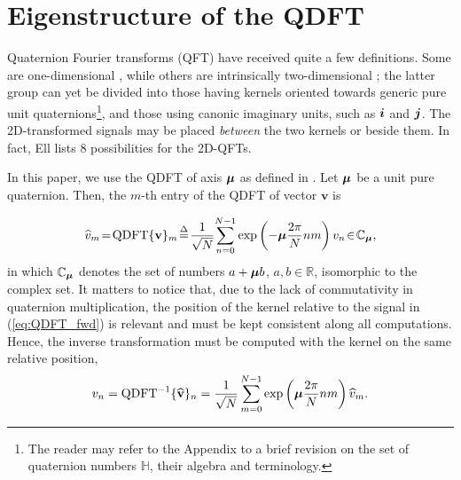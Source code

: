 \section{Eigenstructure of the QDFT}
\label{sec:autoestrutura}
Quaternion Fourier transforms (QFT) have received quite a few definitions. Some are one-dimensional \cite{flamant2017spectral}, while others are intrinsically two-dimensional \cite{guanlei2008fractional}; the latter group can yet be divided into those having kernels oriented towards generic pure unit quaternions\footnote{The reader may refer to the Appendix to a brief revision on the set of quaternion numbers $ \mathbb{H} $, their algebra and terminology.}, and those using canonic imaginary units, such as $ \boldsymbol{i} $ and $ \boldsymbol{j} $. The 2D-transformed signals may be placed \textit{between} the two kernels or beside them. In fact, Ell \cite[sec. 3.2]{ell2014quaternion} lists 8 possibilities for the 2D-QFTs.

In this paper, we use the QDFT of axis $ \boldsymbol{\mu} $ as defined in \cite[sec. 3.3.1]{ell2014quaternion}. Let $ \boldsymbol{\mu} $ be a unit pure quaternion. Then, the $ m$-th entry of the QDFT of vector $ \mathbf{v} $ is

\begin{equation}
\label{eq:QDFT_fwd}
\!\widehat{v}_m \!=\! \text{QDFT}\{ \mathbf{v} \}_m \!\overset{\Delta}{=}\! \frac{1}{\sqrt{N}} \!\sum_{n=0}^{N-1}  \exp \left( -\qmu \frac{2\pi}{N} nm \right) v_n \!\in\! \mathbb{C}_{\qmu},\!
\end{equation}
in which $ \mathbb{C}_{\boldsymbol{\mu}} $ denotes the set of numbers $ a + \boldsymbol{\mu} b $, $ a,b \in \mathbb{R} $, isomorphic to the complex set. It matters to notice that, due to the lack of commutativity in quaternion multiplication, the position of the kernel relative to the signal in (\ref{eq:QDFT_fwd}) is relevant and must be kept consistent along all computations. Hence, the inverse transformation must be computed with the kernel on the same relative position,
\begin{equation}
\label{eq:QDFT_inv}
v_n = \text{QDFT}^{-1}\{ \widehat{\mathbf{v}} \}_n = \frac{1}{\sqrt{N}}\sum_{m=0}^{N-1}  \exp \left( \boldsymbol{\mu} \frac{2\pi}{N} nm \right) \widehat{v}_m.
\end{equation}

